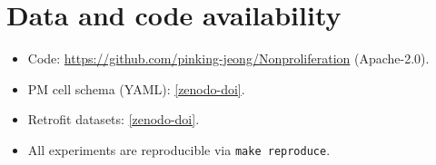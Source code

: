 \documentclass[11pt,a4paper]{article}
\begin{document}
\section*{Data and code availability}
\begin{itemize}[leftmargin=*,itemsep=2pt]
  \item Code: \url{https://github.com/pinking-jeong/Nonproliferation} (Apache-2.0).
  \item PM cell schema (YAML): \url{[zenodo-doi]}.
  \item Retrofit datasets: \url{[zenodo-doi]}.
  \item All experiments are reproducible via \texttt{make reproduce}.
\end{itemize}



\end{document}
